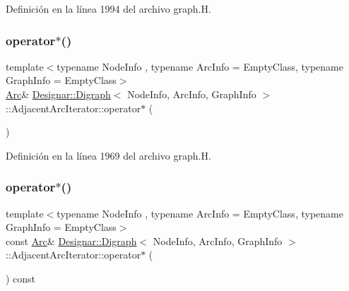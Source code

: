Definición en la línea 1994 del archivo graph.\+H.

\mbox{\label{class_designar_1_1_digraph_1_1_adjacent_arc_iterator_a2a1ee85a8076e07fd99d35676ec69887}} 
\subsubsection{\texorpdfstring{operator$\ast$()}{operator*()}\hspace{0.1cm}{\footnotesize\ttfamily [1/2]}}
{\footnotesize\ttfamily template$<$typename Node\+Info , typename Arc\+Info  = Empty\+Class, typename Graph\+Info  = Empty\+Class$>$ \\
\hyperlink{class_designar_1_1_digraph_a0ceb278671f2a535c00fddccdeafd69f}{Arc}\& \hyperlink{class_designar_1_1_digraph}{Designar\+::\+Digraph}$<$ Node\+Info, Arc\+Info, Graph\+Info $>$\+::Adjacent\+Arc\+Iterator\+::operator$\ast$ (\begin{DoxyParamCaption}{ }\end{DoxyParamCaption})\hspace{0.3cm}{\ttfamily [inline]}}



Definición en la línea 1969 del archivo graph.\+H.

\mbox{\label{class_designar_1_1_digraph_1_1_adjacent_arc_iterator_aaf54c97702c3b6e3ccf419c2f7966e44}} 
\subsubsection{\texorpdfstring{operator$\ast$()}{operator*()}\hspace{0.1cm}{\footnotesize\ttfamily [2/2]}}
{\footnotesize\ttfamily template$<$typename Node\+Info , typename Arc\+Info  = Empty\+Class, typename Graph\+Info  = Empty\+Class$>$ \\
const \hyperlink{class_designar_1_1_digraph_a0ceb278671f2a535c00fddccdeafd69f}{Arc}\& \hyperlink{class_designar_1_1_digraph}{Designar\+::\+Digraph}$<$ Node\+Info, Arc\+Info, Graph\+Info $>$\+::Adjacent\+Arc\+Iterator\+::operator$\ast$ (\begin{DoxyParamCaption}{ }\end{DoxyParamCaption}) const\hspace{0.3cm}{\ttfamily [inline]}}



